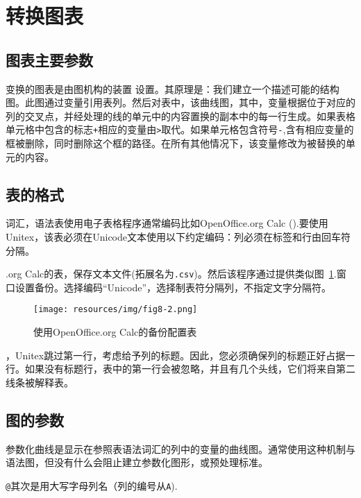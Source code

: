 \section{转换图表}
\subsection{图表主要参数}
变换的图表是由图机构的装置
设置。其原理是：我们建立一个描述可能的结构图。此图通过变量引用表列。然后对表中，该曲线图，其中，变量根据位于对应的列的交叉点，并经处理的线的单元中的内容置换的副本中的每一行生成。如果表格单元格中包含的标志\verb$+$相应的变量由\verb+>+取代。如果单元格包含符号\verb+-+,含有相应变量的框被删除，同时删除这个框的路径。在所有其他情况下，该变量修改为被替换的单元的内容。


\subsection{表的格式}
词汇，语法表使用电子表格程序通常编码比如OpenOffice.org Calc (\cite{OpenOffice}).要使用Unitex，该表必须在Unicode文本使用以下约定编码：列必须在标签和行由回车符分隔。

\bigskip
{}.org Calc的表，保存文本文件(拓展名为\verb$.csv$)。然后该程序通过提供类似图~\ref{fig-csv-export}.窗口设置备份。选择编码“Unicode”，选择制表符分隔列，不指定文字分隔符。

\begin{figure}[!ht]
\begin{center}
\texttt{[image: resources/img/fig8-2.png]}
\caption{使用OpenOffice.org Calc的备份配置表\label{fig-csv-export}}
\end{center}
\end{figure}

\bigskip
{}，Unitex跳过第一行，考虑给予列的标题。因此，您必须确保列的标题正好占据一行。如果没有标题行，表中的第一行会被忽略，并且有几个头线，它们将来自第二线条被解释表。



\subsection{图的参数}
参数化曲线是显示在参照表语法词汇的列中的变量的曲线图。通常使用这种机制与语法图，但没有什么会阻止建立参数化图形，或预处理标准。

\bigskip
{}\verb+@+其次是用大写字母列名（列的编号从\verb+A+).

